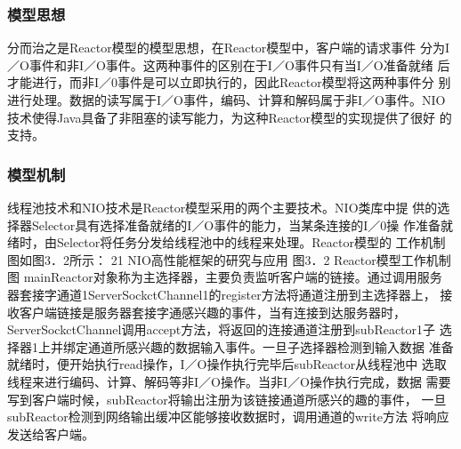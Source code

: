 \subsubsection*{模型思想}
分而治之是Reactor模型的模型思想，在Reactor模型中，客户端的请求事件
分为I／O事件和非I／O事件。这两种事件的区别在于I／O事件只有当I／O准备就绪
后才能进行，而非I／0事件是可以立即执行的，因此Reactor模型将这两种事件分
别进行处理。数据的读写属于I／O事件，编码、计算和解码属于非I／O事件。NIO
技术使得Java具备了非阻塞的读写能力，为这种Reactor模型的实现提供了很好
的支持。
\subsubsection*{模型机制}
线程池技术和NIO技术是Reactor模型采用的两个主要技术。NIO类库中提
供的选择器Selector具有选择准备就绪的I／O事件的能力，当某条连接的I／0操
作准备就绪时，由Selector将任务分发给线程池中的线程来处理。Reactor模型的
工作机制图如图3．2所示：
21
NIO高性能框架的研究与应用
图3．2 Reactor模型工作机制图
mainReactor对象称为主选择器，主要负责监听客户端的链接。通过调用服务
器套接字通道1ServerSockctChannel1的register方法将通道注册到主选择器上，
接收客户端链接是服务器套接字通感兴趣的事件，当有连接到达服务器时，
ServerSockctChannel调用accept方法，将返回的连接通道注册到subReactor1子
选择器1上并绑定通道所感兴趣的数据输入事件。一旦子选择器检测到输入数据
准备就绪时，便开始执行read操作，I／O操作执行完毕后subReactor从线程池中
选取线程来进行编码、计算、解码等非I／O操作。当非I／O操作执行完成，数据
需要写到客户端时候，subReactor将输出注册为该链接通道所感兴的趣的事件，
一旦subReactor检测到网络输出缓冲区能够接收数据时，调用通道的write方法
将响应发送给客户端。

